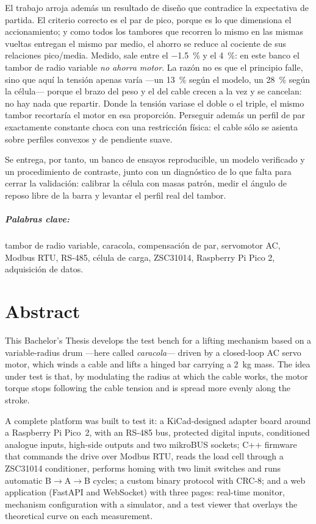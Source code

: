 El trabajo arroja además un resultado de diseño que contradice la expectativa de partida. El
criterio correcto es el par de pico, porque es lo que dimensiona el accionamiento; y como todos los
tambores que recorren lo mismo en las mismas vueltas entregan el mismo par medio, el ahorro se
reduce al cociente de sus relaciones pico/media. Medido, sale entre el \SI{-1.5}{\percent} y el
\SI{+4}{\percent}: en este banco el tambor de radio variable \emph{no ahorra motor}. La razón no es
que el principio falle, sino que aquí la tensión apenas varía ---un \SI{13}{\percent} según el
modelo, un \SI{28}{\percent} según la célula--- porque el brazo del peso y el del cable crecen a la
vez y se cancelan: no hay nada que repartir. Donde la tensión variase el doble o el triple, el mismo
tambor recortaría el motor en esa proporción. Perseguir además un perfil de par exactamente constante
choca con una restricción física: el cable sólo se asienta sobre perfiles convexos y de pendiente
suave.

Se entrega, por tanto, un banco de ensayos reproducible, un modelo verificado y un procedimiento de
contraste, junto con un diagnóstico de lo que falta para cerrar la validación: calibrar la célula con
masas patrón, medir el ángulo de reposo libre de la barra y levantar el perfil real del tambor.

\paragraph{Palabras clave:} tambor de radio variable, caracola, compensación de par, servomotor AC,
Modbus RTU, RS-485, célula de carga, ZSC31014, Raspberry Pi Pico 2, adquisición de datos.

\chapter{Abstract}

This Bachelor's Thesis develops the test bench for a lifting mechanism based on a variable-radius
drum ---here called \emph{caracola}--- driven by a closed-loop AC servo motor, which winds a cable
and lifts a hinged bar carrying a \SI{2}{\kilo\gram} mass. The idea under test is that, by modulating
the radius at which the cable works, the motor torque stops following the cable tension and is spread
more evenly along the stroke.

A complete platform was built to test it: a KiCad-designed adapter board around a Raspberry Pi
Pico~2, with an RS-485 bus, protected digital inputs, conditioned analogue inputs, high-side outputs
and two mikroBUS sockets; C++ firmware that commands the drive over Modbus RTU, reads the load cell
through a ZSC31014 conditioner, performs homing with two limit switches and runs automatic
B$\rightarrow$A$\rightarrow$B cycles; a custom binary protocol with CRC-8; and a web application
(FastAPI and WebSocket) with three pages: real-time monitor, mechanism configuration with a
simulator, and a test viewer that overlays the theoretical curve on each measurement.

